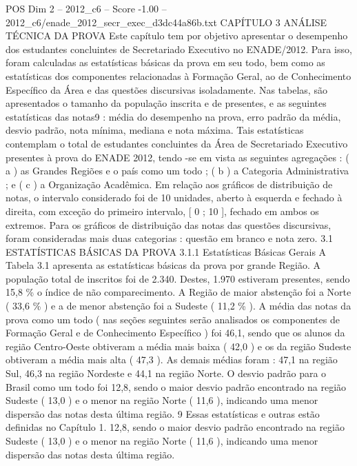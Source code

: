 \begin{textsample}{POS Dim 2 – 2012\_c6 – Score -1.00 – 2012\_c6/enade\_2012\_secr\_exec\_d3dc44a86b.txt}  \label{ex:f2_pos_254}
CAPÍTULO 3 ANÁLISE TÉCNICA DA PROVA Este capítulo tem por objetivo apresentar o desempenho dos estudantes concluintes de Secretariado Executivo no ENADE/2012.
Para isso, foram calculadas as estatísticas básicas da prova em seu todo, bem como as estatísticas dos componentes relacionadas à Formação Geral, ao de Conhecimento Específico da Área e das questões discursivas isoladamente.
Nas tabelas, são apresentados o tamanho da população inscrita e de presentes, e as seguintes estatísticas das notas9 : média do desempenho na prova, erro padrão da média, desvio padrão, nota mínima, mediana e nota máxima.
Tais estatísticas contemplam o total de estudantes concluintes da Área de Secretariado Executivo presentes à prova do ENADE 2012, tendo -se em vista as seguintes agregações : ( a ) as Grandes Regiões e o país como um todo ; ( b ) a Categoria Administrativa ; e ( c ) a Organização Acadêmica.
Em relação aos gráficos de distribuição de notas, o intervalo considerado foi de 10 unidades, aberto à esquerda e fechado à direita, com exceção do primeiro intervalo, [ 0 ; 10 ], fechado em ambos os extremos.
Para os gráficos de distribuição das notas das questões discursivas, foram consideradas mais duas categorias : questão em branco e nota zero. 3.1 ESTATÍSTICAS BÁSICAS DA PROVA 3.1.1 Estatísticas Básicas Gerais A Tabela 3.1 apresenta as estatísticas básicas da prova por grande Região.
A população total de inscritos foi de 2.340.
Destes, 1.970 estiveram presentes, sendo 15,8 \% o índice de não comparecimento.
A Região de maior abstenção foi a Norte ( 33,6 \% ) e a de menor abstenção foi a Sudeste ( 11,2 \% ).
A média das notas da prova como um todo ( nas seções seguintes serão analisados os componentes de Formação Geral e de Conhecimento Específico ) foi 46,1, sendo que os alunos da região Centro-Oeste obtiveram a média mais baixa ( 42,0 ) e os da região Sudeste obtiveram a média mais alta ( 47,3 ).
As demais médias foram : 47,1 na região Sul, 46,3 na região Nordeste e 44,1 na região Norte.
O desvio padrão para o Brasil como um todo foi 12,8, sendo o maior desvio padrão encontrado na região Sudeste ( 13,0 ) e o menor na região Norte ( 11,6 ), indicando uma menor dispersão das notas desta última região. 9 Essas estatísticas e outras estão definidas no Capítulo 1. 12,8, sendo o maior desvio padrão encontrado na região Sudeste ( 13,0 ) e o menor na região Norte ( 11,6 ), indicando uma menor dispersão das notas desta última região.

\end{textsample}
